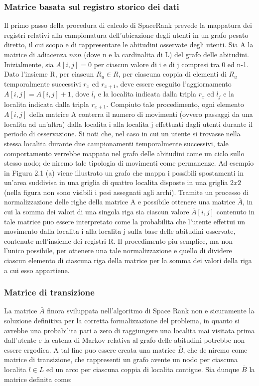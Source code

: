 \subsubsection{Matrice basata sul registro storico dei dati}
Il primo passo della procedura di calcolo di SpaceRank prevede la mappatura
dei registri relativi alla campionatura dell'ubicazione degli utenti in un grafo
pesato diretto, il cui scopo e di rappresentare le abitudini osservate degli utenti.
Sia A la matrice di adiacenza $n x n$ (dove n e la cardinalita di L) del
grafo delle abitudini. Inizialmente, sia $A[i, j] = 0$ per ciascun valore di i e di
j compresi tra 0 ed n-1. Dato l'insieme R, per ciascun $R_{u} \in R$, per ciascuna
coppia di elementi di $R_{u}$ temporalmente successivi $r_{x}$ ed $r_{x+1}$, deve essere eseguito
l'aggiornamento $A[i, j] = A[i, j] + 1$, dove $l_{i}$ e la localita indicata dalla
tripla $r_{x}$ ed $l_{j}$ e la localita indicata dalla tripla $r_{x+1}$. Compiuto tale procedimento,
ogni elemento $A[i, j]$ della matrice A conterra il numero di movimenti
(ovvero passaggi da una localita ad un'altra) dalla localita i alla localita j effettuati
dagli utenti durante il periodo di osservazione. Si noti che, nel caso
in cui un utente si trovasse nella stessa localita durante due campionamenti
temporalmente successivi, tale comportamento verrebbe mappato nel grafo
delle abitudini come un ciclo sullo stesso nodo; deniremo tale tipologia di
movimenti come permanenze.
Ad esempio in Figura 2.1 (a) viene illustrato un grafo che mappa i possibili
spostamenti in un'area suddivisa in una griglia di quattro localita disposte in
una griglia $2 x 2$ (nella figura non sono visibili i pesi assegnati agli archi).
Tramite un processo di normalizzazione delle righe della matrice A e possibile
ottenere una matrice $\bar{A}$, in cui la somma dei valori di una singola riga sia
ciascun valore $\bar{A}[i, j]$ contenuto in tale matrice puo essere interpretato come
la probabilita che l'utente effettui un movimento dalla localita i alla localita
j sulla base delle abitudini osservate, contenute nell'insieme dei registri R. Il
procedimento piu semplice, ma non l'unico possibile, per ottenere una tale
normalizzazione e quello di dividere ciascun elemento di ciascuna riga della
matrice per la somma dei valori della riga a cui esso appartiene.

\subsubsection{Matrice di transizione}
La matrice $\bar{A}$ finora sviluppata nell'algoritmo di Space Rank non e sicuramente
la soluzione definitiva per la corretta formalizzazione del problema, in quanto
si avrebbe una probabilita pari a zero di raggiungere una localita mai visitata
prima dall'utente e la catena di Markov relativa al grafo delle abitudini
potrebbe non essere ergodica. A tal fine puo essere creata una matrice $\bar{B}$,
che deniremo come matrice di transizione, che rappresenti un grafo avente
un nodo per ciascuna localita $l \in L$ ed un arco per ciascuna coppia di localita
contigue. Sia dunque $\bar{B}$ la matrice definita come:

